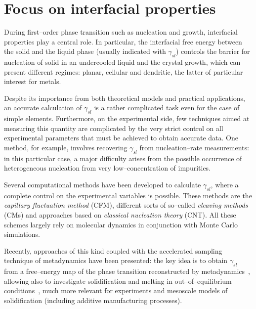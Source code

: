 \section{Focus on interfacial properties}
During first--order phase transition such as nucleation and growth, interfacial properties play a central role. In particular, the interfacial free energy between the solid and the liquid phase (usually indicated with $\gamma_{sl}$) controls the barrier for nucleation of solid in an undercooled liquid and the crystal growth, which can present different regimes: planar, cellular and dendritic, the latter of particular interest for metals.

Despite its importance from both theoretical models and practical applications, an accurate calculation of $\gamma_{sl}$ is a rather complicated task even for the case of simple elements. Furthermore, on the experimental side, few techniques aimed at measuring this quantity are complicated by the very strict control on all experimental parameters that must be achieved to obtain accurate data. One method, for example, involves recovering $\gamma_{sl}$ from nucleation--rate measurements: in this particular case, a major difficulty arises from the possible occurrence of heterogeneous nucleation from very low--concentration of impurities.

Several computational methods have been developed to calculate $\gamma_{sl}$, where a complete control on the experimental variables is possible. These methods are the \emph{capillary fluctuation method} (CFM), different sorts of so--called \emph{cleaving methods} (CMs) and approaches based on \emph{classical nucleation theory} (CNT). All these schemes largely rely on molecular dynamics in conjunction with Monte Carlo simulations.

Recently, approaches of this kind coupled with the accelerated sampling technique of metadynamics have been presented: the key idea is to obtain $\gamma_{sl}$ from a free--energy map of the phase transition reconstructed by metadynamics~\cite{Angioletti-Uberti2010}, allowing also to investigate solidification and melting in out--of--equilibrium conditions~\cite{Cheng2015}, much more relevant for experiments and mesoscale models of solidification (including additive manufacturing processes).


